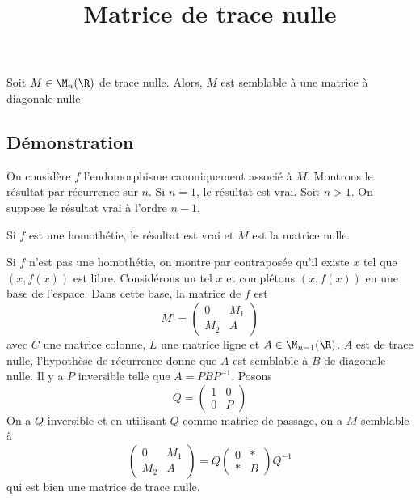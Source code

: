 \documentclass[fontsize=12pt,twoside=false,parskip=half]{scrartcl}
\title{Matrice de trace nulle}
\date{}
\author{}
\begin{document}
\maketitle
   \begin{Theoreme}
      Soit $M \in \M_n(\R)$ de trace nulle. Alors, $M$ est semblable à une matrice à diagonale nulle.
   \end{Theoreme}
   \subsection{Démonstration}
      On considère $f$ l’endomorphisme canoniquement associé à $M$.
      Montrons le résultat par récurrence sur $n$. Si $n = 1$, le résultat est vrai.
      Soit $n > 1$. On suppose le résultat vrai à l’ordre $n - 1$.
      
      Si $f$ est une homothétie, le résultat est vrai et $M$ est la matrice nulle.
      
      Si $f$ n’est pas une homothétie, on montre par contraposée qu’il existe $x$ tel que $(x, f(x))$ est libre. 
      Considérons un tel $x$ et complétons $(x, f(x))$ en une base
      de l’espace. Dans cette base, la matrice de $f$ est
      \[
         M’ = 
         \begin{pmatrix}
            0 & M_1\\
            M_2 & A
         \end{pmatrix}
      \]
      avec $C$ une matrice colonne, $L$ une matrice ligne et $A \in \M_{n - 1}(\R)$. $A$ est de trace nulle,
      l’hypothèse de récurrence donne que $A$ est semblable à $B$ de diagonale nulle. Il y a $P$ inversible telle que $A = PBP^{-1}$. Posons
      \[
         Q = 
         \begin{pmatrix}
           1 & 0\\
           0 & P
         \end{pmatrix}
      \]
      On a $Q$ inversible et en utilisant $Q$ comme matrice de passage, on a $M$ semblable à
      \[
         \begin{pmatrix}
            0 & M_1\\
            M_2 & A
         \end{pmatrix} = Q \begin{pmatrix}
         0  & *\\
         * & B
         \end{pmatrix} Q^{-1}        
      \]
      qui est bien une matrice de trace nulle.
\end{document}
